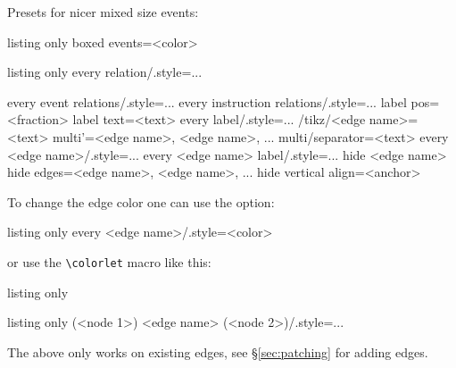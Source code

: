 \documentclass[a4paper]{article}
\begin{document}
Presets for nicer mixed size events:
\begin{tcblisting}{listing only}
boxed events=<color> %
\end{tcblisting}

\begin{tcblisting}{listing only}
every relation/.style={...}

every event relations/.style={...}
every instruction relations/.style={...}
label pos=<fraction> %
label text=<text> %
every label/.style={...}
/tikz/<edge name>=<text> %
multi'={<edge name>, <edge name>, ...} %
multi/separator={<text>} %
every <edge name>/.style={...}
every <edge name> label/.style={...}
hide <edge name>
hide edges={<edge name>, <edge name>, ...} %
hide %
vertical align=<anchor> %

\end{tcblisting}

To change the edge color one can use the option:
\begin{tcblisting}{listing only}
every <edge name>/.style={<color>}
\end{tcblisting}
or use the \lstinline[language={[LaTeX]TeX},basicstyle=\footnotesize\ttfamily]|\colorlet| macro like this:
\begin{tcblisting}{listing only}
\end{tcblisting}

\begin{tcblisting}{listing only}
(<node 1>) <edge name> (<node 2>)/.style={...}
\end{tcblisting}
The above only works on existing edges, see \S\ref{sec:patching} for adding edges.
\end{document}
